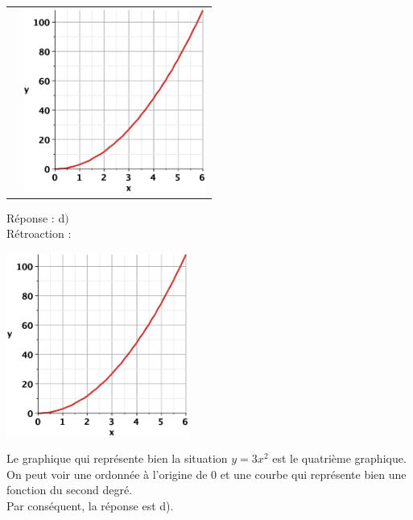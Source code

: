 \documentclass[letterpaper, 12pt]{article}
\begin{document}
\begin{tabular}{l l}
&

 \includegraphics[width=6cm,height=6cm,bb=20 118 575 673]{Q2076d.eps}


\end{tabular}

R\'eponse : d$)$\\

R\'etroaction :\\
\begin{center}
 \includegraphics[width=6cm,height=6cm,bb=20 118 575 673]{Q2076d.eps}
\end{center}
Le graphique qui repr\'esente bien la situation $y=3x^{2}$ est le quatri\`eme graphique. On peut voir une ordonn\'ee \`a l'origine de 0 et une courbe qui repr\'esente bien une fonction du second degr\'e.\\
Par cons\'equent, la r\'eponse est d).\\
\end{document}
